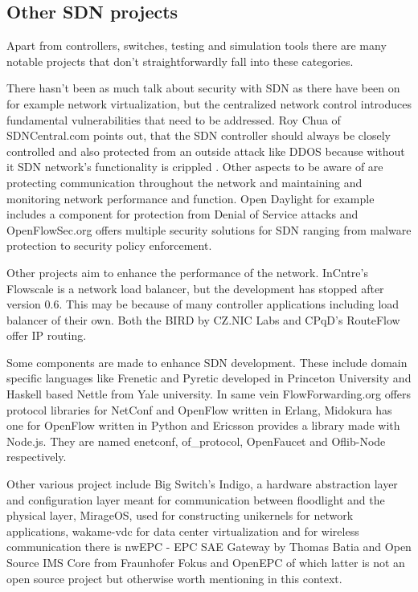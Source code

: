 \documentclass[english]{tktltiki2}
\theoremstyle{definition}
\theoremstyle{remark}
\begin{document}
{\subsection{Other SDN projects}

Apart from controllers, switches, testing and simulation tools there are many notable projects that don’t straightforwardly fall into these categories.

There hasn’t been as much talk about security with SDN as there have been on for example network virtualization, but the centralized network control introduces fundamental vulnerabilities that need to be addressed. Roy Chua of SDNCentral.com points out, that the SDN controller should always be closely controlled and also protected from an outside attack like DDOS because without it SDN network's functionality is crippled \cite{CHU2} . Other aspects to be aware of are protecting communication throughout the network and maintaining and monitoring network performance and function. Open Daylight for example includes a component for protection from Denial of Service attacks and OpenFlowSec.org offers multiple security solutions for SDN ranging from malware protection to security policy enforcement.

Other projects aim to enhance the performance of the network. InCntre’s Flowscale is a network load balancer, but the development has stopped after version 0.6. This may be because of many controller applications including load balancer of their own. Both the BIRD by CZ.NIC Labs and CPqD’s RouteFlow offer IP routing.

Some components are made to enhance SDN development. These include domain specific languages like Frenetic and Pyretic developed in Princeton University and Haskell based Nettle from Yale university. In same vein FlowForwarding.org offers protocol libraries for NetConf and OpenFlow written in Erlang, Midokura has one for OpenFlow written in Python and Ericsson provides a library made with Node.js. They are named enetconf, of\_protocol, OpenFaucet and Oflib-Node respectively. 

Other various project include Big Switch’s Indigo, a hardware abstraction layer and configuration layer meant for communication between floodlight and the physical layer, MirageOS, used for constructing unikernels for network applications, wakame-vdc for data center virtualization and for wireless communication there is nwEPC - EPC SAE Gateway by Thomas Batia and Open Source IMS Core from Fraunhofer Fokus and OpenEPC of which latter is not an open source project but otherwise worth mentioning in this context. 

}
\end{document}
